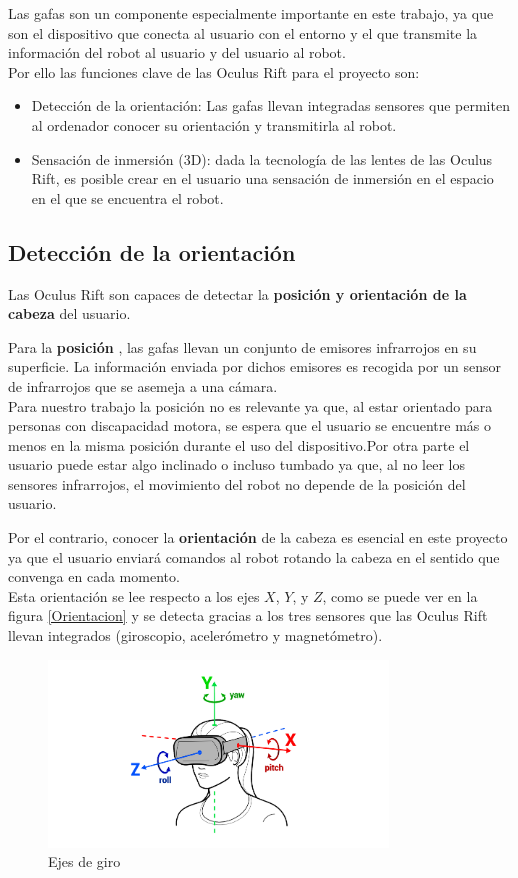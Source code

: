 \documentclass[twoside, 11pt]{epstfg}
\begin{document}
Las gafas son un componente especialmente importante en este trabajo, ya que son el dispositivo que conecta al usuario con el entorno y el que transmite la información del robot al usuario y del usuario al robot.\\
Por ello las funciones clave de las Oculus Rift para el proyecto son:
\begin{itemize}
	\item Detección de la orientación: Las gafas llevan integradas sensores que permiten al ordenador conocer su orientación y transmitirla al robot.
	\item Sensación de inmersión (3D): dada la tecnología de las lentes de las Oculus Rift, es posible crear en el usuario una sensación de inmersión en el espacio en el que se encuentra el robot.
\end{itemize}

\subsection{Detección de la orientación}


Las Oculus Rift son capaces de detectar la \textbf{posición y orientación de la cabeza} del usuario.

Para la \textbf{posición} , las gafas llevan un conjunto de emisores infrarrojos en su superficie. La información enviada por dichos emisores es recogida por un sensor de infrarrojos que se asemeja a una cámara.\\
Para nuestro trabajo la posición no es relevante ya que, al estar orientado para personas con discapacidad motora,  se espera que el usuario se encuentre más o menos en la misma posición durante el uso del dispositivo.Por otra parte el usuario puede estar algo inclinado o incluso tumbado ya que, al no leer los sensores infrarrojos, el movimiento del robot no depende de la posición del usuario.


Por el contrario, conocer la \textbf{orientación} de la cabeza es esencial en este proyecto ya que el usuario enviará comandos al robot rotando la cabeza en el sentido que convenga en cada momento.\\Esta orientación se lee respecto a los ejes $X$, $Y$, y $Z$, como se puede ver en la figura \ref{Orientacion}  y se detecta gracias a los tres sensores que las Oculus Rift llevan integrados (giroscopio, acelerómetro y magnetómetro).

\begin{figure}[H]
	\centerline{
		\mbox{\includegraphics[width=3.55in]{images/headTrack.png}}
	}
	\caption{Ejes de giro}
\end{figure}\label{Orientacion}
\end{document}
